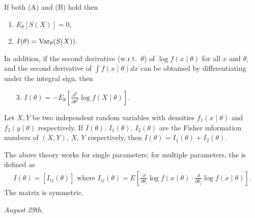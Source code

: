 \begin{theorem}
    If both (A) and (B) hold then
    \begin{enumerate}
        \item $E_{\theta} [S(X)] = 0$,
        \item $I(\theta) = \operatorname{Var}_{\theta}(S(X))$.
    \end{enumerate}
    In addition, if the second derivative (w.r.t.~$\theta$) of $\log f(x \mid \theta)$ for all $x$ and $\theta$, and the second derivative of $\int f(x \mid \theta) dx$ can be obtained by differentiating under the integral sign, then
    \begin{enumerate}
        \item[3.] $I(\theta) = -E_{\theta}[\frac{\partial^{2}}{\partial \theta^{2}} \log f(X \mid \theta)]$. 
    \end{enumerate}
\end{theorem}

\begin{theorem}
    Let $X,Y$ be two independent random variables with densities $f_{1}(x \mid \theta)$ and $f_{2}(y \mid \theta)$ respectively. If $I(\theta)$, $I_{1}(\theta)$, $I_{2}(\theta)$ are the Fisher information numbers of $(X,Y)$, $X$, $Y$ respectively, then $I(\theta) = I_{1}(\theta) + I_{2}(\theta)$.
\end{theorem}

The above theory works for single parameters; for multiple parameters, the  is defined as
\begin{align}
    I(\theta) = [I_{ij}(\theta)] \text{ where } I_{ij}(\theta) = E \left[ \frac{\partial}{\partial \theta_{i}} \log f(x \mid \theta) \cdot \frac{\partial}{\partial \theta_{j}} \log f(x \mid \theta) \right].
\end{align}
The matrix is symmetric.

\textit{August 29th.}

